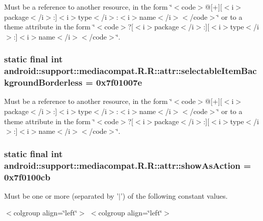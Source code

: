 Must be a reference to another resource, in the form \char`\"{}$<$code$>$@\mbox{[}+\mbox{]}\mbox{[}$<$i$>$package$<$/i$>$:\mbox{]}$<$i$>$type$<$/i$>$:$<$i$>$name$<$/i$>$$<$/code$>$\char`\"{} or to a theme attribute in the form \char`\"{}$<$code$>$?\mbox{[}$<$i$>$package$<$/i$>$:\mbox{]}\mbox{[}$<$i$>$type$<$/i$>$:\mbox{]}$<$i$>$name$<$/i$>$$<$/code$>$\char`\"{}. \hypertarget{classandroid_1_1support_1_1mediacompat_1_1_r_1_1attr_b8ed5c6555b45508ed1ae2cb2e7b26d6}{
\subsubsection[{selectableItemBackgroundBorderless}]{\setlength{\rightskip}{0pt plus 5cm}static final int android::support::mediacompat.R.R::attr::selectableItemBackgroundBorderless = 0x7f01007e}}
\label{classandroid_1_1support_1_1mediacompat_1_1_r_1_1attr_b8ed5c6555b45508ed1ae2cb2e7b26d6}


Must be a reference to another resource, in the form \char`\"{}$<$code$>$@\mbox{[}+\mbox{]}\mbox{[}$<$i$>$package$<$/i$>$:\mbox{]}$<$i$>$type$<$/i$>$:$<$i$>$name$<$/i$>$$<$/code$>$\char`\"{} or to a theme attribute in the form \char`\"{}$<$code$>$?\mbox{[}$<$i$>$package$<$/i$>$:\mbox{]}\mbox{[}$<$i$>$type$<$/i$>$:\mbox{]}$<$i$>$name$<$/i$>$$<$/code$>$\char`\"{}. \hypertarget{classandroid_1_1support_1_1mediacompat_1_1_r_1_1attr_eae34d80038ee0f0e9010ef4b4b40928}{
\subsubsection[{showAsAction}]{\setlength{\rightskip}{0pt plus 5cm}static final int android::support::mediacompat.R.R::attr::showAsAction = 0x7f0100cb}}
\label{classandroid_1_1support_1_1mediacompat_1_1_r_1_1attr_eae34d80038ee0f0e9010ef4b4b40928}


Must be one or more (separated by '$|$') of the following constant values. \begin{TabularC}{0}
\hline
\end{TabularC}
$<$colgroup align=\char`\"{}left\char`\"{}$>$ $<$colgroup align=\char`\"{}left\char`\"{}$>$ 

